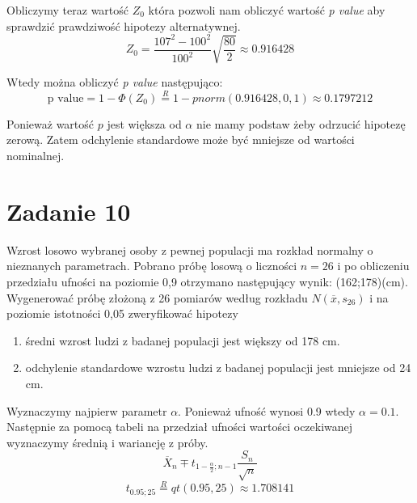 \documentclass{article}
\begin{document}
Obliczymy teraz wartość $Z_0$ która pozwoli nam obliczyć wartość \textit{p value} aby sprawdzić prawdziwość hipotezy alternatywnej.
\[ Z_0 = \frac{107^2 - 100^2}{100^2} \sqrt{ \frac{80}{2} } \approx 0.916428 \]

Wtedy można obliczyć \textit{p value} następująco:
\[ \text{p value} = 1 - \Phi(Z_0) \overset{R}{=} 1 - pnorm(0.916428, 0, 1) \approx 0.1797212 \]

Ponieważ wartość $p$ jest większa od $\alpha$ nie mamy podstaw żeby odrzucić hipotezę zerową. Zatem odchylenie standardowe może być mniejsze od wartości nominalnej.

\newpage
\section{Zadanie 10}
Wzrost losowo wybranej osoby z pewnej populacji ma rozkład normalny o nieznanych parametrach. Pobrano próbę losową o liczności $n=26$ i po obliczeniu przedziału ufności na poziomie 0,9 otrzymano następujący wynik: (162;178)(cm). Wygenerować próbę złożoną z 26 pomiarów według rozkładu $N(\overline{x},s_{26})$ i na poziomie istotności 0,05 zweryfikować hipotezy
\begin{enumerate}[label = \alph*)]
\item średni wzrost ludzi z badanej populacji jest większy od 178 cm.
\item odchylenie standardowe wzrostu ludzi z badanej populacji jest mniejsze od 24 cm.
\end{enumerate}

Wyznaczymy najpierw parametr $\alpha$. Ponieważ ufność wynosi 0.9 wtedy $\alpha = 0.1$. \\
Następnie za pomocą tabeli na przedział ufności wartości oczekiwanej wyznaczymy średnią i wariancję z próby.
\[ \overline{X}_n \mp t_{1-\frac{\alpha}{2};n-1} \frac{S_n}{\sqrt{n}} \]
\[ t_{0.95;25} \overset{R}{=} qt(0.95, 25) \approx 1.708141 \]
\end{document}
